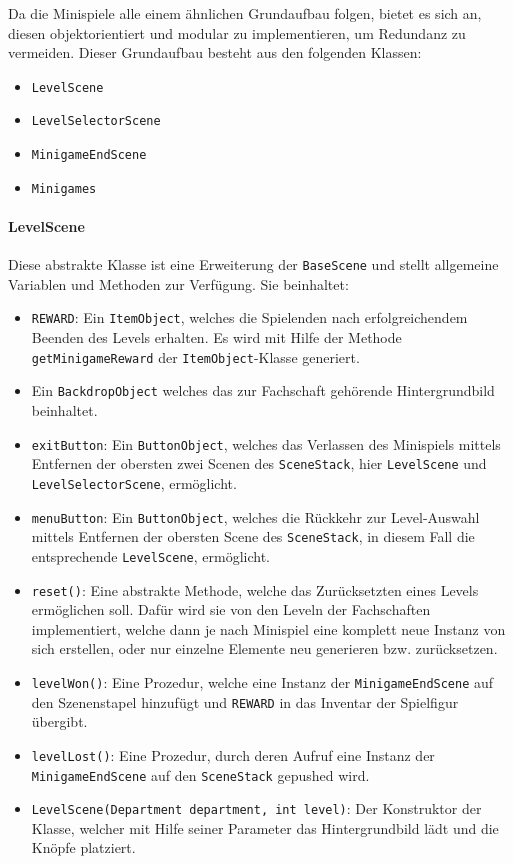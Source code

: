 Da die Minispiele alle einem ähnlichen Grundaufbau folgen, bietet es sich an, diesen objektorientiert und modular zu implementieren, um Redundanz zu vermeiden.
Dieser Grundaufbau besteht aus den folgenden Klassen:

\begin{itemize}
    \item \texttt{LevelScene}
    \item \texttt{LevelSelectorScene}
    \item \texttt{MinigameEndScene}
    \item \texttt{Minigames}
\end{itemize}

\paragraph{LevelScene} Diese abstrakte Klasse ist eine Erweiterung der \texttt{BaseScene} und stellt allgemeine Variablen und Methoden zur Verfügung.
Sie beinhaltet:

\begin{sloppypar}
    \begin{itemize}
        \item \texttt{REWARD}: Ein \texttt{ItemObject}, welches die Spielenden nach erfolgreichendem Beenden des Levels erhalten.
            Es wird mit Hilfe der Methode \texttt{getMinigameReward} der \texttt{ItemObject}-Klasse generiert.
        \item Ein \texttt{BackdropObject} welches das zur Fachschaft gehörende Hintergrundbild beinhaltet.
        \item \texttt{exitButton}: Ein \texttt{ButtonObject}, welches das Verlassen des Minispiels mittels Entfernen der obersten zwei Scenen des \texttt{SceneStack}, hier \texttt{LevelScene} und \texttt{LevelSelectorScene}, ermöglicht.
        \item \texttt{menuButton}: Ein \texttt{ButtonObject}, welches die Rückkehr zur Level-Auswahl mittels Entfernen der obersten Scene des \texttt{SceneStack}, in diesem Fall die entsprechende \texttt{LevelScene}, ermöglicht.
        \item \texttt{reset()}: Eine abstrakte Methode, welche das Zurücksetzten eines Levels ermöglichen soll.
            Dafür wird sie von den Leveln der Fachschaften implementiert, welche dann je nach Minispiel eine komplett neue Instanz von sich erstellen, oder nur einzelne Elemente neu generieren bzw. zurücksetzen.
        \item \texttt{levelWon()}: Eine Prozedur, welche eine Instanz der \texttt{MinigameEndScene} auf den Szenenstapel hinzufügt und \texttt{REWARD} in das Inventar der Spielfigur übergibt.
        \item \texttt{levelLost()}: Eine Prozedur, durch deren Aufruf eine Instanz der \texttt{MinigameEndScene} auf den \texttt{SceneStack} gepushed wird.
        \item \texttt{LevelScene(Department department, int level)}: Der Konstruktor der Klasse, welcher mit Hilfe seiner Parameter das Hintergrundbild lädt und die Knöpfe platziert.
    \end{itemize}
\end{sloppypar}

